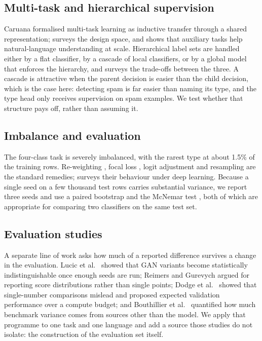 \documentclass[12pt,a4paper]{article}
\begin{document}
\subsection{Multi-task and hierarchical supervision}
Caruana \cite{caruana1997} formalised multi-task learning as inductive transfer through a shared representation; \cite{ruder2017} surveys the design space, and \cite{liu2019mtnn} shows that auxiliary tasks help natural-language understanding at scale. Hierarchical label sets are handled either by a flat classifier, by a cascade of local classifiers, or by a global model that enforces the hierarchy, and \cite{silla2011} surveys the trade-offs between the three. A cascade is attractive when the parent decision is easier than the child decision, which is the case here: detecting spam is far easier than naming its type, and the type head only receives supervision on spam examples. We test whether that structure pays off, rather than assuming it.

\subsection{Imbalance and evaluation}
The four-class task is severely imbalanced, with the rarest type at about 1.5\% of the training rows. Re-weighting \cite{cb2019}, focal loss \cite{focal2017}, logit adjustment \cite{logit2021} and resampling are the standard remedies; \cite{imbalance2019} surveys their behaviour under deep learning. Because a single seed on a few thousand test rows carries substantial variance, we report three seeds and use a paired bootstrap \cite{efron1979} and the McNemar test \cite{dietterich1998}, both of which are appropriate for comparing two classifiers on the same test set.

\subsection{Evaluation studies}
A separate line of work asks how much of a reported difference survives a change in the evaluation. Lucic et al.\ \cite{lucic2018} showed that GAN variants become statistically indistinguishable once enough seeds are run; Reimers and Gurevych \cite{reimers2017} argued for reporting score distributions rather than single points; Dodge et al.\ \cite{dodge2019} showed that single-number comparisons mislead and proposed expected validation performance over a compute budget; and Bouthillier et al.\ \cite{bouthillier2021} quantified how much benchmark variance comes from sources other than the model. We apply that programme to one task and one language and add a source those studies do not isolate: the construction of the evaluation set itself.
\end{document}
